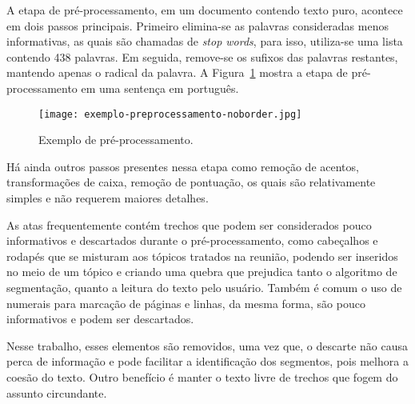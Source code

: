 	A etapa de pré-processamento, em um documento contendo texto puro, acontece em dois passos principais. Primeiro elimina-se as palavras consideradas menos informativas, as quais são chamadas de \textit{stop words}, para isso, utiliza-se uma lista contendo 438 palavras. Em seguida, remove-se os sufixos das palavras restantes, mantendo apenas o radical da palavra. A Figura~\ref{fig:exemplopreprocessamento} mostra a etapa de pré-processamento em uma sentença em português.
	



  \begin{figure}[!h]
	\centering
	\texttt{[image: exemplo-preprocessamento-noborder.jpg]}
	\caption{Exemplo de pré-processamento.}
	\label{fig:exemplopreprocessamento}
  \end{figure}


Há ainda outros passos presentes nessa etapa como remoção de acentos, transformações de caixa, remoção de pontuação, os quais são relativamente simples e não requerem maiores detalhes.






As atas frequentemente contém trechos que podem ser considerados pouco informativos e descartados durante o pré-processamento, como cabeçalhos e rodapés que se misturam aos tópicos tratados na reunião, podendo ser  inseridos no meio de um tópico e criando uma quebra que prejudica tanto o algoritmo de segmentação, quanto a leitura do texto pelo usuário.
Também é comum o uso de numerais para marcação de páginas e linhas, da mesma forma, são pouco informativos e podem ser descartados.


Nesse trabalho, esses elementos são removidos, uma vez que, o descarte não causa perca de informação e pode facilitar a identificação dos segmentos, pois melhora a coesão do texto. Outro benefício é manter o texto livre de trechos que fogem do assunto circundante.





		
